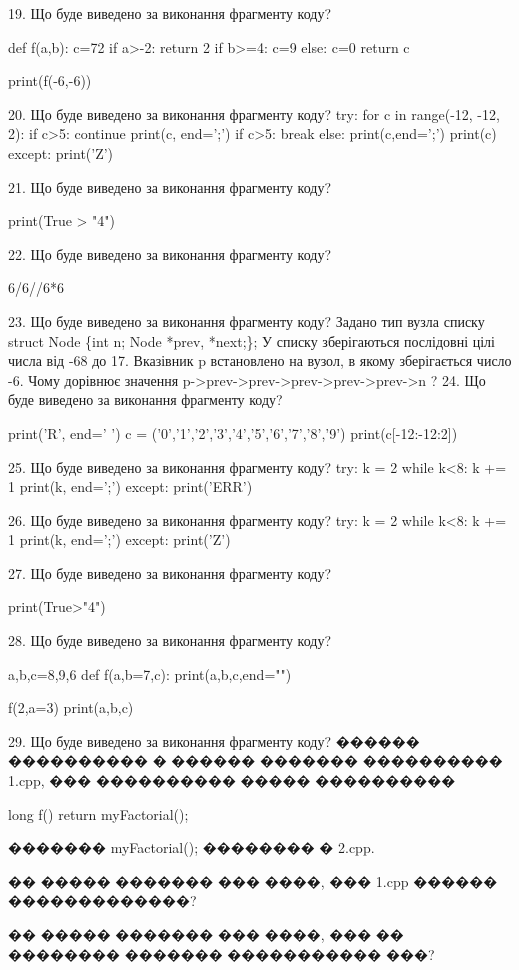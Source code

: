 \documentclass[11pt]{article}
\begin{document}

19. Що буде виведено за виконання фрагменту коду?

def f(a,b):
    c=72
    if a>-2:
        return 2
    if b>=4:
         c=9
    else: 
        c=0
    return c

print(f(-6,-6))

20. Що буде виведено за виконання фрагменту коду?
try:
    for c in range(-12, -12, 2):
        if c>5:
            continue
        print(c, end=';')
        if c>5:
            break
    else:
        print(c,end=';')
    print(c)
except:
    print('Z')

21. Що буде виведено за виконання фрагменту коду?

print(True > "4")

22. Що буде виведено за виконання фрагменту коду?

6/6//6*6

23. Що буде виведено за виконання фрагменту коду?
Задано тип вузла списку
struct Node \{int n; Node *prev, *next;\};
У списку зберігаються послідовні цілі числа від -68 до 17. Вказівник p встановлено на вузол, в якому зберігається число -6.
Чому дорівнює значення p->prev->prev->prev->prev->prev->n ?
24. Що буде виведено за виконання фрагменту коду?

print('R', end=' ')
c = ('0','1','2','3','4','5','6','7','8','9')
print(c[-12:-12:2])


25. Що буде виведено за виконання фрагменту коду?
try:
    k = 2
    while k<8:
        k += 1
    print(k, end=';')
except:
    print('ERR')

26. Що буде виведено за виконання фрагменту коду?
try:
    k = 2
    while k<8:
        k += 1
    print(k, end=';')
except:
    print('Z')

27. Що буде виведено за виконання фрагменту коду?

print(True>"4")

28. Що буде виведено за виконання фрагменту коду?

a,b,c=8,9,6
def f(a,b=7,c):
    print(a,b,c,end="")

f(2,a=3)
print(a,b,c)


29. Що буде виведено за виконання фрагменту коду?
������ ���������� � ������ ������� ���������� 1.cpp, ��� ���������� ����� ����������\par
long f(){ return myFactorial();}\par
������� myFactorial(); �������� � 2.cpp.\par
�� ����� ������� ��� ����, ��� 1.cpp ������ �������������?\par\vspace{1.5cm}
�� ����� ������� ��� ����, ��� �� �������� ������� ����������� ���?\par
\end{document}
